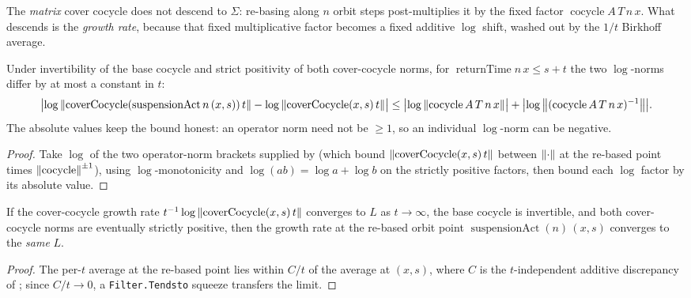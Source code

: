The \emph{matrix} cover cocycle does not descend to $\Sigma$: re-basing along $n$ orbit steps
post-multiplies it by the fixed factor $\operatorname{cocycle} A\,T\,n\,x$. What descends is the
\emph{growth rate}, because that fixed multiplicative factor becomes a fixed additive $\log$
shift, washed out by the $1/t$ Birkhoff average.

\begin{theorem}\label{thm:susp-logDisc}
  \leanok
  Under invertibility of the base cocycle and strict positivity of both cover-cocycle norms, for
  $\operatorname{returnTime} n\,x \le s + t$ the two $\log$-norms differ by at most a constant in
  $t$:
  \[
    \bigl|\log\left\lVert \operatorname{coverCocycle}(\operatorname{suspensionAct} n\,(x, s))\,t \right\rVert
      - \log\left\lVert \operatorname{coverCocycle}(x, s)\,t \right\rVert\bigr|
      \le \bigl|\log\left\lVert \operatorname{cocycle} A\,T\,n\,x \right\rVert\bigr|
        + \bigl|\log\left\lVert (\operatorname{cocycle} A\,T\,n\,x)^{-1} \right\rVert\bigr|.
  \]
  The absolute values keep the bound honest: an operator norm need not be $\ge 1$, so an
  individual $\log$-norm can be negative.
\end{theorem}
\begin{proof}\leanok
  Take $\log$ of the two operator-norm brackets supplied by  (which
  bound $\left\lVert \operatorname{coverCocycle}(x, s)\,t \right\rVert$ between $\left\lVert \cdot \right\rVert$ at the re-based
  point times $\left\lVert \operatorname{cocycle} \right\rVert^{\pm1}$), using $\log$-monotonicity and
  $\log(ab) = \log a + \log b$ on the strictly positive factors, then bound each $\log$ factor by
  its absolute value.
\end{proof}

\begin{theorem}\label{thm:susp-limitTransfer}
  \leanok
  If the cover-cocycle growth rate $t^{-1}\log\left\lVert \operatorname{coverCocycle}(x, s)\,t \right\rVert$
  converges to $L$ as $t \to \infty$, the base cocycle is invertible, and both cover-cocycle
  norms are eventually strictly positive, then the growth rate at the re-based orbit point
  $\operatorname{suspensionAct}(n)\,(x, s)$ converges to the \emph{same} $L$.
\end{theorem}
\begin{proof}\leanok
  The per-$t$ average at the re-based point lies within $C/t$ of the average at $(x, s)$, where
  $C$ is the $t$-independent additive discrepancy of ; since
  $C/t \to 0$, a \texttt{Filter.Tendsto} squeeze transfers the limit.
\end{proof}


